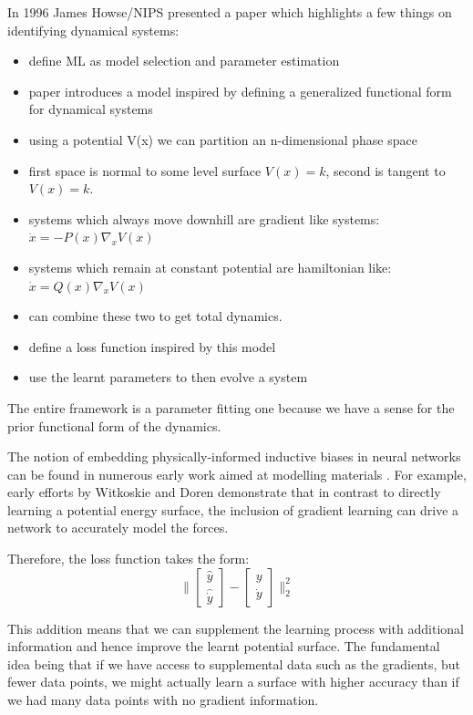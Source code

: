 \documentclass{article}
\begin{document}
In 1996 James Howse/NIPS presented a paper which highlights a few things on identifying dynamical systems:

\begin{itemize}
\item define ML as model selection and parameter estimation
\item paper introduces a model inspired by defining a generalized functional form for dynamical systems
\item using a potential V(x) we can partition an n-dimensional phase space
\item first space is normal to some level surface $V(x)=k$, second is tangent to $V(x)=k$.
\item systems which always move downhill are gradient like systems: $ \dot{x} = - P(x)\nabla_{x} V(x) $
\item systems which remain at constant potential are hamiltonian like: $\dot{x} = Q(x)\nabla_x V(x)$
\item can combine these two to get total dynamics.
\item define a loss function inspired by this model
\item use the learnt parameters to then evolve a system
\end{itemize}

The entire framework is a parameter fitting one because we have a sense for the prior functional form of the dynamics.


The notion of embedding physically-informed inductive biases in neural networks can be found in numerous early work aimed at modelling materials \cite{witkoskie_neural_2005, pukrittayakamee_simultaneous_2009, smith_ani-1_2017, rupp_fast_2012, yao_tensormol-01_2018}. For example, early efforts by Witkoskie and Doren \cite{witkoskie_neural_2005} demonstrate that in contrast to directly learning a potential energy surface, the inclusion of gradient learning can drive a network to accurately model the forces. 

Therefore, the loss function takes the form:
$$
\Bigg\|
\begin{bmatrix}
\hat{y} \\
\hat{\dot{y}}
\end{bmatrix}
-
\begin{bmatrix}
y \\
\dot{y}
\end{bmatrix}
\Bigg\|_2^2
$$

This addition means that we can supplement the learning process with additional information and hence improve the learnt potential surface. The fundamental idea being that if we have access to supplemental data such as the gradients, but fewer data points, we might actually learn a surface with higher accuracy than if we had many data points with no gradient information. 
\end{document}
